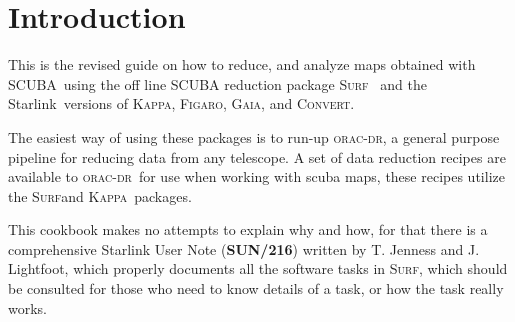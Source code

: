 \documentclass[twoside,11pt]{article}
\newcommand{\stardocinitials}  {SC}
\newcommand{\stardocnumber}    {11.2}
\newcommand{\stardocabstract}  {[Text of abstract]}
\newcommand{\scuba}{\htmladdnormallink{SCUBA}{http://www.jach.hawaii.edu/JCMT/}}
\newcommand{\starlink}{\htmladdnormallink{Starlink}{http://star-www.rl.ac.uk/}}
\newcommand{\Kappa}{\xref{\textsc{Kappa}}{sun95}{}}
\newcommand{\Figaro}{\xref{\textsc{Figaro}}{sun86}{}}
\newcommand{\gaia}{\xref{\textsc{Gaia}}{sun214}{}}
\newcommand{\convert}{\xref{\textsc{Convert}}{sun55}{}}
\newcommand{\surf}{\xref{\textsc{Surf}}{sun216}{}}
\newcommand{\oracdr}{\xref{\textsc{orac-dr}}{sun231}{}}
\newcommand{\stardocname}{\stardocinitials /\stardocnumber}
\newcommand{\htmladdnormallink}[2]{#1}
\newenvironment{latexonly}{}{}
\newcommand{\xref}[3]{#1}
\newcommand{\xlabel}[1]{}
\renewcommand{\_}{\texttt{\symbol{95}}}
\renewcommand{\thepage}{\roman{page}}
\begin{document}
\begin{htmlonly}
\end{htmlonly}





  \newpage
  \begin{latexonly}
    \setlength{\parskip}{0mm}
    \tableofcontents
    \setlength{\parskip}{\medskipamount}
    \markboth{\stardocname}{\stardocname}
  \end{latexonly}


\cleardoublepage
\renewcommand{\thepage}{\arabic{page}}
\setcounter{page}{1}


\section{\xlabel{introduction}Introduction}

This is the revised guide on how to reduce, and analyze maps obtained
with \scuba\ using the off line SCUBA reduction package \surf\
\cite{surf} and the \starlink\ versions of \Kappa \cite{kappa},
\Figaro \cite{figaro}, \gaia \cite{gaia}, and \convert \cite{convert}.


The easiest way of using these packages is to run-up \oracdr, a
general purpose pipeline for reducing data from any telescope.  A set
of data reduction recipes are available to \oracdr\ for use when
working with scuba maps, these recipes utilize the \surf and \Kappa\ packages.


This cookbook makes no attempts to explain why and how, for that there
is a comprehensive Starlink User Note
(\xref{\textbf{SUN/216}}{sun216}{}) written by T. Jenness and J.
Lightfoot, which properly documents all the software tasks in \surf,
which should be consulted for those who need to know details of a
task, or how the task really works.
\end{document}
